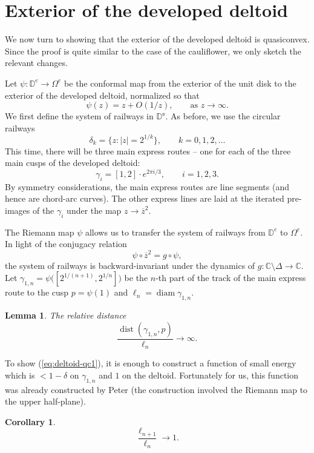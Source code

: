 \documentclass[12pt]{article}
\numberwithin{equation}{section}
\newtheorem{lemma}[theorem]{Lemma}
\newtheorem{corollary}[theorem]{Corollary}
\theoremstyle{remark}
\theoremstyle{definition}
\DeclareMathOperator{\diam}{diam}
\DeclareMathOperator{\dist}{dist}
\begin{document}
 

\section{Exterior of the developed deltoid}

We now turn to showing that the exterior of the developed deltoid is quasiconvex. Since the proof is quite similar to the case of the cauliflower, we only sketch the relevant changes.

Let $\psi: \mathbb{D}^e \to \Omega^e$ be the conformal map from the exterior of the unit disk to the exterior of the developed deltoid, normalized so that
$$
\psi(z) = z + O(1/z), \qquad \text{as }z \to \infty.
$$
We first define the system of railways in $\mathbb{D^e}$. As before, we use the circular railways
$$
\delta_k = \{ z : |z| = 2^{1/k} \}, \qquad k = 0,1,2,\dots
$$
This time, there will be three main express routes -- one for each of the three main cusps of the developed deltoid:
$$
\gamma_i = [1,2] \cdot e^{2\pi i/3}, \qquad i =1,2,3.
$$
By symmetry considerations, the main express routes are line segments (and hence are chord-arc curves).
The other express lines are laid at the iterated pre-images of the $\gamma_i$ under the map $z \to \overline{z}^2$.

The Riemann map $\psi$ allows us to transfer the  system of railways from $\mathbb{D}^e$ to $\Omega^e$. In light of the conjugacy relation 
$$
\psi \circ \overline{z}^2 = g \circ \psi,
$$
 the system of railways is backward-invariant under the dynamics of
$
g: \mathbb{C} \setminus \Delta \to \mathbb{C}.
$
Let $\gamma_{1,n} = \psi \bigl ([2^{1/(n+1)}, 2^{1/n}] \bigr  )$ be the $n$-th part of the track of the main express route to the cusp $p  = \psi(1)$
and $\ell_n = \diam \gamma_{1,n}$.

\begin{lemma} The relative distance
 \begin{equation}
\label{eq:deltoid-qc1}
\frac{\dist(\gamma_{1,n}, p)}{\ell_{n}} \to \infty.
\end{equation}
\end{lemma}

To show (\ref{eq:deltoid-qc1}), it is enough to construct a function of small energy which is $<1-\delta$ on $\gamma_{1,n}$ and $1$ on the deltoid.
Fortunately for us, this function  was already constructed by Peter (the construction involved the Riemann map to the upper half-plane).

\begin{corollary}
\begin{equation}
\label{eq:deltoid-qc2}
\frac{\ell_{n+1}}{\ell_{n}} \to 1.
\end{equation}
\end{corollary}
\end{document}
